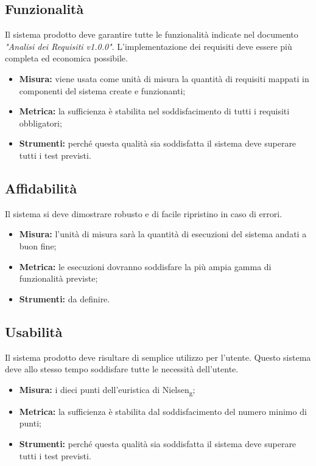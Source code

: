 \documentclass[12pt,a4paper,titlepage]{article}
\begin{document}
		\subsection{Funzionalità}
		Il sistema prodotto deve garantire tutte le funzionalità indicate nel documento \textit{"Analisi dei Requisiti v1.0.0"}. L'implementazione dei requisiti deve essere più completa ed economica possibile.
		\begin{itemize}
			\item \textbf{Misura:} viene usata come unità di misura la quantità di requisiti mappati in componenti del sistema create e funzionanti;
			\item \textbf{Metrica:} la sufficienza è stabilita nel soddisfacimento di tutti i requisiti obbligatori;
			\item \textbf{Strumenti:} perché questa qualità sia soddisfatta il sistema deve superare tutti i test previsti.
		\end{itemize}
		\subsection{Affidabilità}
		Il sistema si deve dimostrare robusto e di facile ripristino in caso di errori.
		\begin{itemize}
			\item \textbf{Misura:} l'unità di misura sarà la quantità di esecuzioni del sistema andati a buon fine;
			\item \textbf{Metrica:} le esecuzioni dovranno soddisfare la più ampia gamma di funzionalità previste;
			\item \textbf{Strumenti:} da definire.
		\end{itemize}
		\subsection{Usabilità}
		Il sistema prodotto deve risultare di semplice utilizzo per l'utente. Questo sistema deve allo stesso tempo soddisfare tutte le necessità dell'utente.
		\begin{itemize}
			\item \textbf{Misura:} i dieci punti dell'euristica di Nielsen\textsubscript{g};
			\item \textbf{Metrica:} la sufficienza è stabilita dal soddisfacimento del numero minimo di punti;
			\item \textbf{Strumenti:} perché questa qualità sia soddisfatta il sistema deve superare tutti i test previsti.
		\end{itemize}
\end{document}
